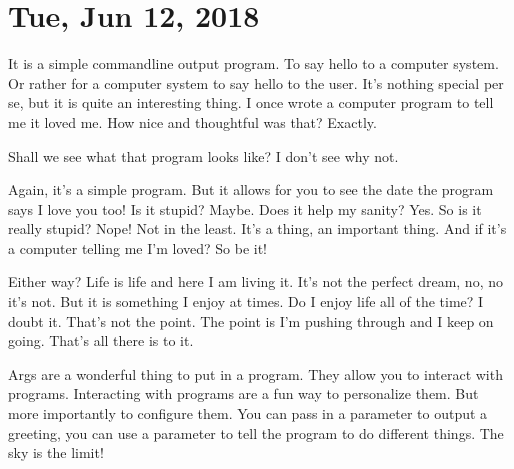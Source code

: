 \section{Tue, Jun 12, 2018}



It is a simple commandline output program. To say hello to a computer system. Or
rather for a computer system to say hello to the user. It's nothing special per
se, but it is quite an interesting thing. I once wrote a computer program to
tell me it loved me. How nice and thoughtful was that? Exactly.

Shall we see what that program looks like? I don't see why not.



Again, it's a simple program. But it allows for you to see the date the program
says I love you too! Is it stupid? Maybe. Does it help my sanity? Yes. So is it
really stupid? Nope! Not in the least. It's a thing, an important thing. And if
it's a computer telling me I'm loved? So be it!

Either way? Life is life and here I am living it. It's not the perfect dream,
no, no it's not. But it is something I enjoy at times. Do I enjoy life all of
the time? I doubt it. That's not the point. The point is I'm pushing through and
I keep on going. That's all there is to it.

Args are a wonderful thing to put in a program. They allow you to interact with
programs. Interacting with programs are a fun way to personalize them. But more
importantly to configure them. You can pass in a parameter to output a greeting,
you can use a parameter to tell the program to do different things. The sky is
the limit!

